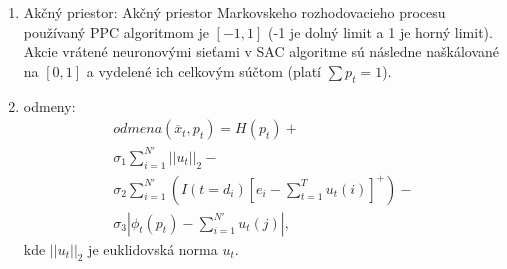 \begin{enumerate}
    \item Akčný priestor: Akčný priestor Markovskeho rozhodovacieho procesu používaný PPC algoritmom je $\left[-1,1\right]$ (-1 je dolný limit a 1 je horný limit). Akcie vrátené neuronovými sieťami v SAC algoritme sú následne naškálované na $\left[0,1\right]$ a vydelené ich celkovým súčtom (platí $\sum p_{t} = 1$).
    \item odmeny: 
    \begin{gather}
        \nonumber
        odmena\left(\overline{x}_{t}, p_{t}\right) = H\left(p_{t}\right) +  \\
        \sigma_{1} \sum_{i = 1}^{N'} ||u_{t}||_{2} - \\
        \nonumber
        \sigma_{2}\sum_{i = 1}^{N'}\left(I(t = d_{i}) \left[e_{i} - \sum_{t = 1}^{T}u_{t}(i)\right]^{+}\right) - \\
        \nonumber
        \sigma_{3}  \left|\phi_{t}(p_{t}) - \sum_{i=1}^{N'} u_{t}(j) \right| ,
    \end{gather}
    kde $||u_{t}||_{2} $ je euklidovská norma $u_{t}$.
    
\end{enumerate}








